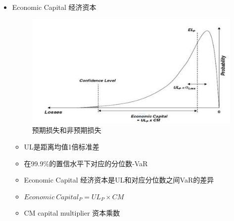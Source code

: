 \documentclass[a4paper,6pt,twoside,openany]{article}
\begin{document}
\begin{itemize}
\item Economic Capital 经济资本
   \begin{figure}[!htbp]
    \centering
    \includegraphics[width=150mm]{Loss_Expected_UnExpected.jpg}
    \caption{预期损失和非预期损失}
  \end{figure}
  \begin{itemize}
    \item UL是距离均值1倍标准差
  \item 在99.9\%的置信水平下对应的分位数-VaR
  \item Economic Capital 经济资本是UL和对应分位数之间VaR的差异
  \item $ Economic\ Capital_P = UL_P \times CM$
  \item CM capital multiplier 资本乘数
  \end{itemize}
\end{itemize}
\end{document}
